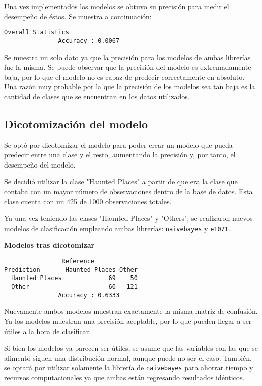 \documentclass[eng]{ajceam-class}
\begin{document}
Una vez implementados los modelos se obtuvo su precisión para medir el desempeño de éstos. Se muestra a continuación:

\begin{verbatim}
Overall Statistics                                
               Accuracy : 0.0067         
\end{verbatim}

Se muestra un solo dato ya que la precisión para los modelos de ambas librerías fue la misma. Se puede observar que la precisión del modelo es extremadamente baja, por lo que el modelo no es capaz de predecir correctamente en absoluto. Una razón muy probable por la que la precisión de los modelos sea tan baja es la cantidad de clases que se encuentran en los datos utilizados.

\subsection{Dicotomización del modelo}

Se optó por dicotomizar el modelo para poder crear un modelo que pueda predecir entre una clase y el resto, aumentando la precisión y, por tanto, el desempeño del modelo.

Se decidió utilizar la clase "Haunted Places" a partir de que era la clase que contaba con un mayor número de observaciones dentro de la base de datos. Esta clase cuenta con un 425 de 1000 observaciones totales.

Ya una vez teniendo las clases "Haunted Places" y "Others", se realizaron nuevos modelos de clasificación empleando ambas librerías: \texttt{naivebayes} y \texttt{e1071}.

\textbf{Modelos tras dicotomizar}
\begin{verbatim}
                Reference
Prediction       Haunted Places Other
  Haunted Places             69    50
  Other                      60   121
               Accuracy : 0.6333
\end{verbatim}

Nuevamente ambos modelos muestran exactamente la misma matriz de confusión. Ya los modelos muestran una precisión aceptable, por lo que pueden llegar a ser útiles a la hora de clasificar. 

Si bien los modelos ya parecen ser útiles, se asume que las variables con las que se alimentó siguen una distribución normal, aunque puede no ser el caso. También, se optará por utilizar solamente la librería de \texttt{naivebayes} para ahorrar tiempo y recursos computacionales ya que ambas están regresando resultados idénticos.
\end{document}
